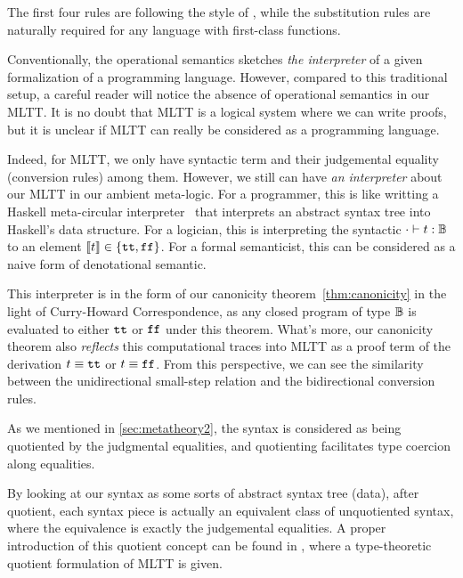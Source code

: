The first four rules are following the style of \citet{program2013homotopy, pfenning2009lecture}, while the substitution rules are naturally required for any language with first-class functions.



  Conventionally, the operational semantics sketches \emph{the interpreter} of a given formalization of a programming language. However, compared to this traditional setup, a careful reader will notice the absence of operational semantics in our MLTT. It is no doubt that MLTT is a logical system where we can write proofs, but it is unclear if MLTT can really be considered as a programming language.


Indeed, for MLTT, we only have syntactic term and their judgemental equality (conversion rules) among them. However, we still can have \emph{an interpreter} about our MLTT in our ambient meta-logic. For a programmer, this is like writting a Haskell meta-circular interpreter~\cite{abelson1996structure} that interprets an abstract syntax tree into Haskell's data structure. For a logician, this is interpreting the syntactic $ {\cdot} \vdash {t} : {\mathbb{B}} $ to an element $\llbracket {t} \rrbracket \in \{\texttt{tt}, \texttt{ff} \}$. For a formal semanticist, this can be considered as a naive form of denotational semantic. 

This interpreter is in the form of our canonicity theorem~\cref{thm:canonicity} in the light of Curry-Howard Correspondence, as any closed program of type $\mathbb{B}$ is evaluated to either $\texttt{tt}$ or $\texttt{ff}$ under this theorem.
What's more, our canonicity theorem also \emph{reflects} this computational traces into MLTT as a proof term of the derivation $t \equiv \texttt{tt}$ or $t \equiv \texttt{ff}$. From this perspective, we can see the similarity between the unidirectional small-step relation and the bidirectional conversion rules.


 As we mentioned in \cref{sec:metatheory2},
the syntax is considered as being quotiented by the judgmental equalities, and 
quotienting facilitates type coercion along equalities. 


By looking at our syntax as some sorts of abstract syntax tree (data), after quotient,
each syntax piece is actually an equivalent class of unquotiented syntax, where 
the equivalence is exactly the judgemental equalities.  A proper introduction 
of this quotient concept 
can be found in \citet{altkap2016,kaposi2017type}, where a type-theoretic quotient formulation 
of MLTT is given.

